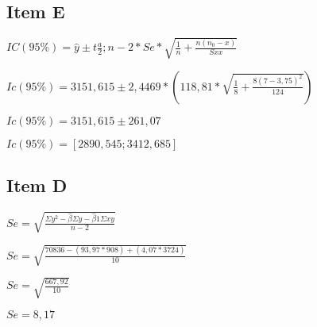 \documentclass{article}
\begin{document}
\subsection{Item E}

\begin{flushleft}
$IC(95\%) = \hat{y} \pm  t \frac{a}{2}; n-2 *Se * \sqrt{\frac{1}{n} + \frac{n(n_0 - x)}{Sxx}}$ 

$Ic(95\%) = 3151,615 \pm 2,4469 *  (118,81* \sqrt{\frac{1}{8} + \frac{8(7-3,75)^2}{124}})$

$Ic(95\%) =  3151,615 \pm 261,07$

$Ic(95\%) = [2890,545 ; 3412,685]$

\end{flushleft}








        \subsection{Item D}
            \begin{flushleft}
                $Se = \sqrt{ \frac{\Sigma y^2 - \hat{\beta } \Sigma y - \hat{\beta}1 \Sigma xy }{n-2}}$
            \end{flushleft}    
            
            \begin{flushleft}
                $Se = \sqrt{ \frac{70836 - (93,97*908)+ (4,07*3724) }{10}}$

                $Se = \sqrt{ \frac{667,92 }{10}}$

                $Se = 8,17$
            \end{flushleft}      
\end{document}
